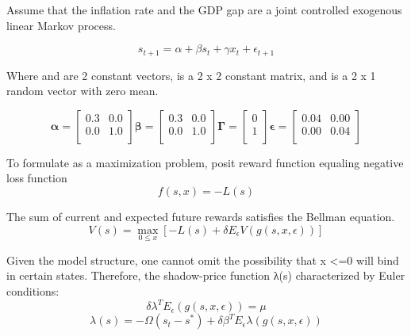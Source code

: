 \documentclass[a4paper,oneside]{article}
\begin{document}
Assume that the inflation rate and the GDP gap are a joint controlled exogenous linear Markov process.

\begin{equation}
	s_{t+1}= \alpha+\beta s_{t}+\gamma x_{t}+\epsilon_{t+1} 
	\label{eq:mye3}
\end{equation}

Where \textalpha \: and \textGamma \: are 2  constant vectors, \textbeta \: is a 2 x 2 constant matrix, and \textepsilon \: is a 2 x 1 random vector with zero mean. 

\begin{equation*}
	\bm{\alpha} =
		\left.
			\begin{bmatrix}
				0.3	&	0.0\\
				0.0	&	1.0\\
			\end{bmatrix} 
		\right.
	\bm{\beta} =      
		\left.
			\begin{bmatrix}
				0.3	&	0.0\\
				0.0	&	1.0\\
			\end{bmatrix} 
		\right.
	\bm{\Gamma} =
		\left.
			\begin{bmatrix}
				0	\\
				1	\\
			\end{bmatrix}
		\right.
	\bm{\epsilon} = 
		\left.
			\begin{bmatrix}
				0.04 &	0.00\\
				0.00 &	0.04\\
			\end{bmatrix}
		\right.
\end{equation*}

  To formulate as a maximization problem, posit reward function equaling negative loss function
  \begin{equation*}
	  f(s, x) = -L(s)
  \end{equation*}
  
  The sum of current and expected future rewards satisfies the Bellman equation.
  \begin{equation}
	V(s) = \max\limits_{{0 \leq x}} [ - L(s) + \delta E_{\epsilon}V(g(s,x,\epsilon))]
	  \label{eq:myeq3}
  \end{equation}
  
  Given the model structure, one cannot omit the possibility that x <=0 will bind in certain states.
  Therefore, the shadow-price function λ(s) characterized by Euler conditions:
\begin{equation}
    \delta \lambda^{T} E_{\epsilon} (g(s, x, \epsilon)) =  \mu
\end{equation}
\begin{equation}
	\lambda(s) = -\Omega(s_{t}-s^{*}) + \delta \beta^{T}E_{\epsilon} \lambda (g(s,x,\epsilon))
\end{equation}
  
\end{document}
